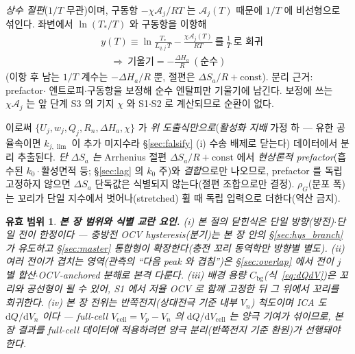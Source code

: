 \documentclass[11pt,a4paper]{article}
\newtheorem*{boundbox}{유효 범위}
\newcommand{\dd}{\mathrm{d}}
\newcommand{\cell}{\mathrm{cell}}
\newcommand{\bg}{\mathrm{bg}}
\begin{document}
\begin{enumerate}[label=\textbf{S\arabic*.},leftmargin=2.6em,itemsep=2pt]
  \emph{상수 절편}($1/T$ 무관)이며, 구동항 $-\chi\mathcal A_j/RT$ 는 $\mathcal A_j(T)$ 때문에 $1/T$ 에 비선형으로
  섞인다. 좌변에서 $\ln(T_*/T)$ 와 구동항을 이항해
  \begin{equation}
  \boxed{\;\begin{aligned}
  &y(T)\equiv\ln\frac{T_*}{L_{q,j}\,T}-\frac{\chi\mathcal A_j(T)}{RT}\ \text{를}\ \tfrac1T\ \text{로 회귀}\\[2pt]
  &\quad\Rightarrow\ \text{기울기}=-\frac{\Delta H_a}{R}\ (\text{순수})
  \end{aligned}\;}
  \label{eq:arrhenius}
  \end{equation}
  (이항 후 남는 $1/T$ 계수는 $-\Delta H_a/R$ 뿐, 절편은 $\Delta S_a/R+\text{const}$). 분리 근거: prefactor$\cdot$
  엔트로피$\cdot$구동항을 보정해 순수 엔탈피만 기울기에 남긴다. 보정에 쓰는 $\chi\mathcal A_j$ 는 앞 단계
  S3 의 기지 $\chi$ 와 S1$\cdot$S2 로 계산되므로 순환이 없다.
\end{enumerate}
이로써 $\{U_j,w_j,Q_j,R_n,\Delta H_a,\chi\}$ 가 \emph{위 도출식만으로}(\emph{활성화 지배} 가정 하 — 유한 공율속이면
$k_{j,\lim}$ 이 추가 미지수라 \S\ref{sec:falsify} (i) 수송 배제로 닫는다) 데이터에서 분리 추출된다. \emph{단 $\Delta S_a$ 는}
Arrhenius 절편 $\Delta S_a/R+\text{const}$ 에서 \emph{현상론적 prefactor}(흡수된 $k_0\cdot$활성면적 등; \S\ref{sec:lag} 의
$k_0$ 주)와 \emph{결합}으로만 나오므로, prefactor 를 독립 고정하지 않으면 $\Delta S_a$ 단독값은 식별되지 않는다(절편
조합으로만 결정). $\rho_G$(분포 폭)는 꼬리가 단일 지수에서 벗어나(stretched) 휠 때 독립 입력으로 더한다(역산 금지).
\begin{boundbox}
\textbf{본 장 범위와 식별 교란 요인.} (i) 본 \emph{절}의 닫힌식은 \emph{단일 방향}(방전)$\cdot$단일 전이 한정이다 —
충방전 OCV hysteresis(분기)는 본 장 \emph{안}의 \S\ref{sec:hys_branch} 가 유도하고 \S\ref{sec:master} 통합형이
확장한다(충전 \emph{꼬리} 동역학만 방향별 별도). (ii) 여러 전이가 겹치는 영역(관측의 ``다음 peak 와 겹침'')은 \S\ref{sec:overlap} 에서 전이 $j$ 별
합산$\cdot$OCV-anchored 분해로 본격 다룬다. (iii) 배경 용량 $C_\bg$(식~\eqref{eq:dQdV})은 꼬리와 공선형이
될 수 있어, S1 에서 저율 OCV 로 함께 고정한 뒤 그 위에서 꼬리를 회귀한다. (iv) 본 장 전위는 \emph{반쪽전지}(상대전극
기준 내부 $V_n$) 척도이며 ICA 도 $\dd Q/\dd V_n$ 이다 — full-cell $V_\cell=V_p-V_n$ 의 $\dd Q/\dd V_\cell$ 는 양극
기여가 섞이므로, 본 장 결과를 full-cell 데이터에 적용하려면 양극 분리(반쪽전지 기준 환원)가 선행돼야 한다.
\end{boundbox}

\end{document}
